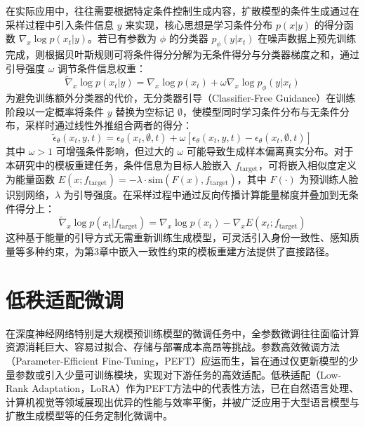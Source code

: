 在实际应用中，往往需要根据特定条件控制生成内容，扩散模型的条件生成通过在采样过程中引入条件信息 $y$ 来实现，核心思想是学习条件分布 $p(x|y)$ 的得分函数 $\nabla_x\log p(x_t|y)$。若已有参数为 $\phi$ 的分类器 $p_\phi(y|x_t)$ 在噪声数据上预先训练完成，则根据贝叶斯规则可将条件得分分解为无条件得分与分类器梯度之和，通过引导强度 $\omega$ 调节条件信息权重：
\begin{equation}\label{eq:guided_score}
      \tilde{\nabla}_x\log p(x_t|y) = \nabla_x\log p(x_t) + \omega\nabla_x\log p_\phi(y|x_t)
\end{equation}
为避免训练额外分类器的代价，无分类器引导（Classifier-Free Guidance）在训练阶段以一定概率将条件 $y$ 替换为空标记 $\emptyset$，使模型同时学习条件分布与无条件分布，采样时通过线性外推组合两者的得分：
\begin{equation}\label{eq:cfg}
      \tilde{\epsilon}_\theta(x_t,y,t) = \epsilon_\theta(x_t,\emptyset,t) + \omega\left[\epsilon_\theta(x_t,y,t) - \epsilon_\theta(x_t,\emptyset,t)\right]
\end{equation}
其中 $\omega>1$ 可增强条件影响，但过大的 $\omega$ 可能导致生成样本偏离真实分布。对于本研究中的模板重建任务，条件信息为目标人脸嵌入 $f_{\text{target}}$，可将嵌入相似度定义为能量函数 $E(x;f_{\text{target}}) = -\lambda\cdot\text{sim}(F(x), f_{\text{target}})$，其中 $F(\cdot)$ 为预训练人脸识别网络，$\lambda$ 为引导强度。在采样过程中通过反向传播计算能量梯度并叠加到无条件得分上：
\begin{equation}\label{eq:energy_score}
      \tilde{\nabla}_x\log p(x_t|f_{\text{target}}) = \nabla_x\log p(x_t) - \nabla_x E(x_t;f_{\text{target}})
\end{equation}
这种基于能量的引导方式无需重新训练生成模型，可灵活引入身份一致性、感知质量等多种约束，为第3章中嵌入一致性约束的模板重建方法提供了直接路径。

\section{低秩适配微调}\label{sec:peft_lora}

在深度神经网络特别是大规模预训练模型的微调任务中，全参数微调往往面临计算资源消耗巨大、容易过拟合、存储与部署成本高昂等挑战。参数高效微调方法（Parameter-Efficient Fine-Tuning，PEFT）应运而生，旨在通过仅更新模型的少量参数或引入少量可训练模块，实现对下游任务的高效适配。低秩适配（Low-Rank Adaptation，LoRA）\cite{hu2022lora}作为PEFT方法中的代表性方法，已在自然语言处理、计算机视觉等领域展现出优异的性能与效率平衡，并被广泛应用于大型语言模型与扩散生成模型等的任务定制化微调中。

